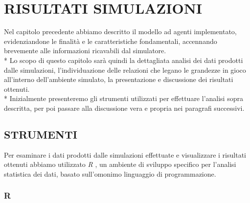 \documentclass[12pt,a4paper,openright,twoside]{report}
\begin{document}
\chapter{RISULTATI SIMULAZIONI}

Nel capitolo precedente abbiamo descritto il modello ad agenti implementato, evidenziandone le finalità e le caratteristiche fondamentali, accennando brevemente alle informazioni ricavabili dal simulatore.\\*
Lo scopo di questo capitolo sarà quindi la dettagliata analisi dei dati prodotti dalle simulazioni, l'individuazione delle relazioni che legano le grandezze in gioco all'interno dell'ambiente simulato, la presentazione e discussione dei risultati ottenuti.\\*
Inizialmente presenteremo gli strumenti utilizzati per effettuare l'analisi sopra descritta, per poi passare alla discussione vera e propria nei paragrafi successivi.

\section{STRUMENTI}
Per esaminare i dati prodotti dalle simulazioni effettuate e visualizzare i risultati ottenuti abbiamo utilizzato \emph{R} \cite{Rlanguage}, un ambiente di sviluppo specifico per l'analisi statistica dei dati, basato sull'omonimo linguaggio di programmazione.

\subsection{R}
\end{document}
